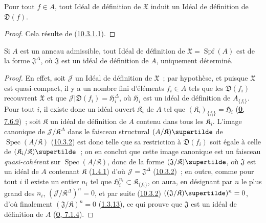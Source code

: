 \begin{proposition}[10.3.4]
\label{I.10.3.4-fr}
Pour tout $f\in A$, tout Idéal de définition de $\mathfrak{X}$ induit un
Idéal de définition de $\mathfrak{D}(f)$.
\end{proposition}

\begin{proof}
Cela résulte de (\hyperref[I.10.3.1.1-fr]{10.3.1.1}).
\end{proof}

\begin{proposition}[10.3.5]
\label{I.10.3.5-fr}
Si $A$ est un anneau admissible, tout Idéal de définition de
$\mathfrak{X}=\operatorname{Spf}(A)$ est de la forme
$\mathfrak{J}^\Delta$, où $\mathfrak{J}$ est un idéal de définition de
$A$, uniquement déterminé.
\end{proposition}

\begin{proof}
En effet, soit $\mathscr{J}$ un Idéal de définition de $\mathfrak{X}$~;
par hypothèse, et puisque $\mathfrak{X}$ est quasi-compact, il y a un nombre
fini d'éléments $f_i\in A$ tels que les $\mathfrak{D}(f_i)$ recouvrent
$\mathfrak{X}$ et que
$\mathscr{J}|\mathfrak{D}(f_i)=\mathfrak{H}_i^\Delta$, où
$\mathfrak{H}_i$ est un idéal de définition de $A_{\{f_i\}}$. Pour tout
$i$, il existe donc un idéal ouvert $\mathfrak{K}_i$ de $A$ tel que
$(\mathfrak{K}_i)_{\{f_i\}}=\mathfrak{H}_i$
(\hyperref[0.7.6.9-fr]{\textbf{0}, 7.6.9})~; soit $\mathfrak{K}$ un idéal de
définition de $A$ contenu dans tous les $\mathfrak{K}_i$. L'image canonique
de $\mathscr{J}/\mathfrak{K}^\Delta$ dans le faisceau structural
$(A/\mathfrak{K})\supertilde$ de
$\operatorname{Spec}(A/\mathfrak{K})$
(\hyperref[I.10.3.2-fr]{10.3.2}) est donc telle que sa restriction à
$\mathfrak{D}(f_i)$ soit égale à celle de
$(\mathfrak{K}_i/\mathfrak{K})\supertilde$~; on en conclut que cette image
canonique est un faisceau \emph{quasi-cohérent} sur
$\operatorname{Spec}(A/\mathfrak{K})$, donc de la forme
$(\mathfrak{J}/\mathfrak{K})\supertilde$, où $\mathfrak{J}$ est un idéal de
$A$ contenant $\mathfrak{K}$ (\hyperref[I.1.4.1-fr]{1.4.1}) d'où
$\mathscr{J}=\mathfrak{J}^\Delta$
(\hyperref[I.10.3.2-fr]{10.3.2})~; en outre, comme pour tout $i$ il existe
un entier $n_i$ tel que
$\mathfrak{H}_i^{n_i}\subset\mathfrak{K}_{\{f_i\}}$, on aura, en désignant
par $n$ le plus grand des $n_i$,
$(\mathscr{J}/\mathfrak{K}^\Delta)^n=0$, et par suite
(\hyperref[I.10.3.2-fr]{10.3.2})
$((\mathfrak{J}/\mathfrak{K})\supertilde)^n=0$, d'où finalement
$(\mathfrak{J}/\mathfrak{K})^n=0$
(\hyperref[I.1.3.13-fr]{1.3.13}), ce qui prouve que $\mathfrak{J}$ est un
idéal de définition de $A$ (\hyperref[0.7.1.4-fr]{\textbf{0}, 7.1.4}).
\end{proof}

